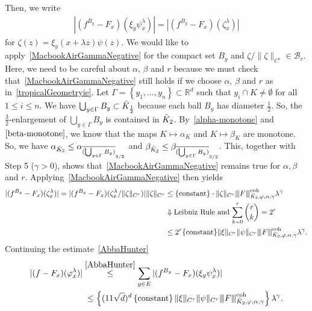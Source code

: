 Then, we write 
\begin{align*}
    | (f^{B_y} - F_x)(\xi_y \psi^\lambda_x) | = | (f^{B_y} - F_x)(\zeta_x^\lambda) |
\end{align*}
for \(\zeta(z) = \xi_y(x + \lambda z) \psi(z)\). We would like to apply~\eqref{MacbookAirGammaNegative} for the compact set \(B_y\) and \(\zeta / \lVert \zeta \rVert_{C^r} \in \mathcal{B}_r\). 
Here, we need to be careful about \(\alpha\), \(\beta\) and \(r\) because we must check that~\eqref{MacbookAirGammaNegative} still holds if we choose \(\alpha\), \(\beta\) and \(r\) as in~\eqref{tropicalGeometryie}. 
Let \(\Gamma = \left\{ y_1,\ldots,y_n \right\} \subset \mathbb{R}^d\) such that \(y_i \cap K \not = \emptyset\) for all \(1 \leq i \leq n\). We have \(\bigcup_{y \in \Gamma}B_y \subset \bar{K}_{\frac{1}{2}}\) because each ball \(B_y\) has diameter \(\frac{1}{2}\). So, the \(\frac{3}{2}\)-enlargement of \(\bigcup_{y \in \Gamma}B_y\) is contained in \(\bar{K}_{2}\).
By~\eqref{alpha-monotone} and \(\eqref{beta-monotone}\), we know that the maps \(K \mapsto \alpha_K\) and \(K \mapsto \beta_K\) are monotone. So, we have \(\alpha_{\bar{K}_{2}} \leq \alpha_{\overline{(\bigcup_{y \in \Gamma}B_y)}_{3/2}}\) and \(\beta_{\bar{K}_{2}} \leq \beta_{\overline{(\bigcup_{y \in \Gamma}B_y)}_{3/2}}\). This, together with Step 5 (\(\gamma > 0\)), shows that~\eqref{MacbookAirGammaNegative} remains true for \(\alpha, \beta\) and \(r\). Applying~\eqref{MacbookAirGammaNegative} then yields
\begin{align*}
    | (f^{B_y} - F_x)(\zeta_x^\lambda) | = | (f^{B_y} - F_x)(\zeta_x^\lambda / \lVert \zeta \rVert_{C^r}) | \lVert \zeta \rVert_{C^r} &\leq \{ \mathrm{constant} \} \cdot \lVert \zeta \rVert_{C^r} {\left\vert\kern-0.25ex\left\vert\kern-0.25ex\left\vert F \right\vert\kern-0.25ex\right\vert\kern-0.25ex\right\vert}^{\mathrm{coh}}_{\bar{K}_{2}, \varphi, \alpha, \gamma} \lambda^\gamma \\
    &\Downarrow \text{Leibniz Rule and \(\sum_{k=0}^r \binom{r}{k} = 2^r\) }\\
    &\leq  2^r \{ \mathrm{constant} \}\lVert \xi \rVert_{C^r} \lVert \psi \rVert_{C^r} {\left\vert\kern-0.25ex\left\vert\kern-0.25ex\left\vert F \right\vert\kern-0.25ex\right\vert\kern-0.25ex\right\vert}^{\mathrm{coh}}_{\bar{K}_{2}, \varphi, \alpha, \gamma} \lambda^\gamma.
\end{align*} 
Continuing the estimate~\eqref{AbbaHunter} 
\begin{align*}
    |(f-F_x)(\varphi^\lambda_x)| &\overset{\eqref{AbbaHunter}}{\leq} \sum_{y \in E} | (f^{B_y} - F_x)(\xi_y \psi^\lambda_x) | \\ 
    &\;\leq \left\{ (11\sqrt{d})^d \left\{ \mathrm{constant} \right\} \lVert \xi \rVert_{C^r}\lVert \psi \rVert_{C^r}{\left\vert\kern-0.25ex\left\vert\kern-0.25ex\left\vert F \right\vert\kern-0.25ex\right\vert\kern-0.25ex\right\vert}^{\mathrm{coh}}_{\bar{K}_{2}, \varphi, \alpha, \gamma} \right\}\lambda^\gamma.
\end{align*}
